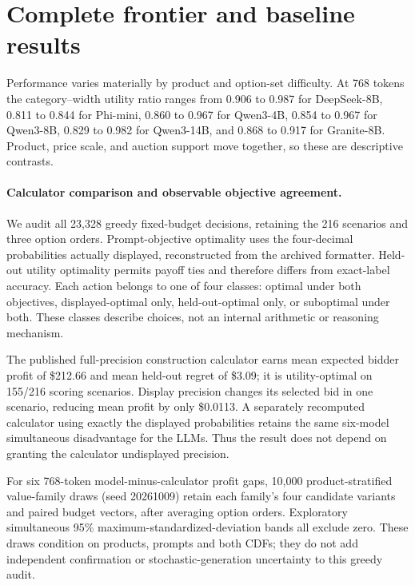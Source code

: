 \documentclass{article}
\begin{document}
\section{Complete frontier and baseline results}
\label{app:fullresults}
Performance varies materially by product and option-set difficulty. At 768 tokens the category--width utility ratio ranges from 0.906 to 0.987 for DeepSeek-8B, 0.811 to 0.844 for Phi-mini, 0.860 to 0.967 for Qwen3-4B, 0.854 to 0.967 for Qwen3-8B, 0.829 to 0.982 for Qwen3-14B, and 0.868 to 0.917 for Granite-8B. Product, price scale, and auction support move together, so these are descriptive contrasts.
\paragraph{Calculator comparison and observable objective agreement.}
We audit all 23,328 greedy fixed-budget decisions, retaining the 216 scenarios and three option orders. Prompt-objective optimality uses the four-decimal probabilities actually displayed, reconstructed from the archived formatter. Held-out utility optimality permits payoff ties and therefore differs from exact-label accuracy. Each action belongs to one of four classes: optimal under both objectives, displayed-optimal only, held-out-optimal only, or suboptimal under both. These classes describe choices, not an internal arithmetic or reasoning mechanism.

The published full-precision construction calculator earns mean expected bidder profit of \$212.66 and mean held-out regret of \$3.09; it is utility-optimal on 155/216 scoring scenarios. Display precision changes its selected bid in one scenario, reducing mean profit by only \$0.0113. A separately recomputed calculator using exactly the displayed probabilities retains the same six-model simultaneous disadvantage for the LLMs. Thus the result does not depend on granting the calculator undisplayed precision.

For six 768-token model-minus-calculator profit gaps, 10,000 product-stratified value-family draws (seed 20261009) retain each family's four candidate variants and paired budget vectors, after averaging option orders. Exploratory simultaneous 95\% maximum-standardized-deviation bands all exclude zero. These draws condition on products, prompts and both CDFs; they do not add independent confirmation or stochastic-generation uncertainty to this greedy audit.
\end{document}
